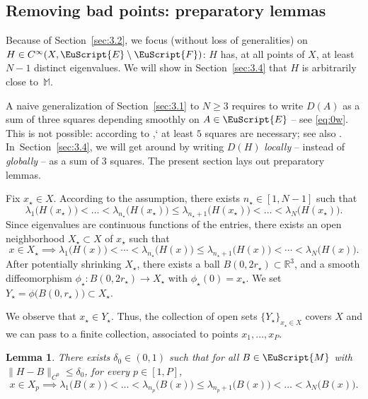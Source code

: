 \documentclass[10pt]{amsart}
\let\pazocal\EuScript
\newtheorem{lem}{Lemma}[section]
\theoremstyle{definition}
\newcommand{\FF}{\pazocal{F}}
\newcommand{\EE}{\pazocal{E}}
\newcommand{\MM}{\pazocal{M}}
\newcommand{\R}{\mathbb{R}}
\newcommand{\Mm}{\mathbb{M}}
\begin{document}
\subsection{Removing bad points: preparatory lemmas}\label{sec:3.3} Because of Section~\ref{sec:3.2}, we focus (without loss of generalities) on $H \in C^\infty(X, \EE\setminus \FF)$: $H$ has, at all points of $X$, at least $N-1$ distinct eigenvalues. We will show in Section~\ref{sec:3.4} that $H$ is arbitrarily close to~$\Mm$.

A naive generalization of Section~\ref{sec:3.1} to $N \geq 3$ requires to write $D(A)$ as a sum of three squares depending smoothly on $A \in \EE$ -- see \eqref{eq:0w}. This is not possible: according to \cite{D11},` at least $5$ squares are necessary; see also \cite{I92,L98,P02,D11}. In~Section~\ref{sec:3.4}, we will get around by writing $D(H)$ \textit{locally} -- instead of \textit{globally} -- as a sum of $3$ squares. The present section lays out preparatory lemmas.

Fix $x_\star \in X$. According to the assumption, there exists $n_\star \in [1,N-1]$ such that
\begin{equation*}
\lambda_1\bigl( H(x_\star) \bigr) < \dots < \lambda_{n_\star}\bigl( H(x_\star) \bigr) \leq \lambda_{n_\star+1}\bigl( H(x_\star) \bigr) < \dots < \lambda_N\bigl( H(x_\star) \bigr).
\end{equation*}
Since eigenvalues are continuous functions of the entries, there exists an open neighborhood $X_\star \subset X$ of $x_\star$ such that
\begin{equation}\label{eq:2c}
x \in X_\star \implies
\lambda_1\bigl( H(x) \bigr) \!<\! \cdots \!<\! \lambda_{n_\star}\bigl( H(x) \bigr) \!\leq\! \lambda_{n_\star+1}\bigl( H(x) \bigr) \!<\! \cdots \!<\! \lambda_N\bigl( H(x) \bigr).
\end{equation}
After potentially shrinking $X_\star$, there exists a ball $B(0,2r_\star) \subset \R^3$, and a smooth diffeomorphism $\phi_\star : B(0,2r_\star) \to X_\star$ with $\phi_\star(0) = x_\star$. We set $Y_\star = \phi\bigl(B(0,r_\star)\bigr) \subset X_\star$.

We observe that $x_\star \in Y_\star$. Thus, the collection of open sets $\{ Y_\star \}_{x_\star \in X}$ covers $X$ and we can pass to a finite collection, associated to points $x_1, \dots, x_P$.

\begin{lem}\label{lem:1b} There exists $\delta_0 \in (0,1)$ such that for all $B \in \MM$ with $\| H-B\|_{C^0} \leq \delta_0$, for every $p \in [1,P]$,
\begin{equation*}
x \in X_p \implies
\lambda_1\bigl( B(x) \bigr) < \dots < \lambda_{n_p}\bigl( B(x) \bigr) \leq \lambda_{n_p+1}\bigl( B(x) \bigr) < \dots < \lambda_N\bigl( B(x) \bigr).
\end{equation*}
\end{lem}
\end{document}
